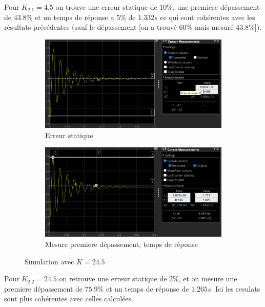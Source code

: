 \documentclass[12pt, a4paper]{report}
\begin{document}
Pour $K_{2.1} = 4.5$ on trouve une erreur statique de $10\%$, une premiere dépassement de $43.8\%$ et un temps de
réponse a $5\%$ de $1.332s$ ce qui sont cohérentes avec les résultats précédentes (sauf le dépassement [on a trouvé $60\%$ mais mesuré $43.8\%$]).

\begin{figure}[H]
    \begin{subfigure}[h!]{0.4\linewidth}
        \includegraphics[width=\linewidth]{sim2kpourerreur2prcerreur.png}
        \caption{Erreur statique}
    \end{subfigure}
    \hfill    
    \begin{subfigure}[h!]{0.4\linewidth}
        \includegraphics[width=\linewidth]{sim2kpourerreur2prcdeptr.png}
        \caption{Mesure premiere dépassement, temps de réponse}
    \end{subfigure}
    \caption{Simulation avec $K = 24.5$}
    \label{fig:sim2Kpour10prc}
\end{figure}

Pour $K_{2.2} = 24.5$ on retrouve une erreur statique de $2\%$, et on mesure une premiere dépassement de $75.9\%$ et un temps de réponse de 
$1.265s$. Ici les resulats sont plus cohérentes avec celles calculées.
\end{document}
